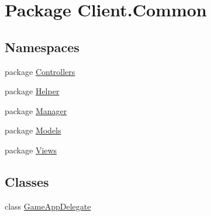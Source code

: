 \hypertarget{namespaceClient_1_1Common}{\section{Package Client.\-Common}
\label{namespaceClient_1_1Common}
}
\subsection*{Namespaces}
\begin{DoxyCompactItemize}
\item 
package \hyperlink{namespaceClient_1_1Common_1_1Controllers}{Controllers}
\item 
package \hyperlink{namespaceClient_1_1Common_1_1Helper}{Helper}
\item 
package \hyperlink{namespaceClient_1_1Common_1_1Manager}{Manager}
\item 
package \hyperlink{namespaceClient_1_1Common_1_1Models}{Models}
\item 
package \hyperlink{namespaceClient_1_1Common_1_1Views}{Views}
\end{DoxyCompactItemize}
\subsection*{Classes}
\begin{DoxyCompactItemize}
\item 
class \hyperlink{classClient_1_1Common_1_1GameAppDelegate}{Game\-App\-Delegate}
\end{DoxyCompactItemize}
